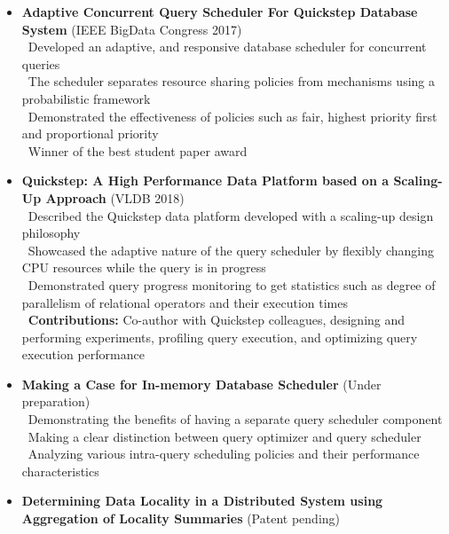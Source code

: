 \documentclass[11pt]{article}
\begin{document}
\begin{itemize}\addtolength{\itemsep}{-0.5\baselineskip}
\item{\textbf{Adaptive Concurrent Query Scheduler For Quickstep Database System} (IEEE BigData Congress 2017)}\\
		\textendash\ Developed an adaptive, and responsive database scheduler for concurrent queries\\
		\textendash\ The scheduler separates resource sharing policies from mechanisms using a probabilistic framework \\
		\textendash\ Demonstrated the effectiveness of policies such as fair, highest priority first and proportional priority\\
		\textendash\ Winner of the best student paper award\\
		
\item{\textbf{Quickstep: A High Performance Data Platform based
on a Scaling-Up Approach} (VLDB 2018)}	\\
		\textendash\ Described the Quickstep data platform developed with a scaling-up design philosophy\\
		\textendash\ Showcased the adaptive nature of the query scheduler by flexibly changing CPU resources while the query is in progress \\
		\textendash\ Demonstrated query progress monitoring to get statistics such as degree of parallelism of relational operators and their execution times\\
		\textendash\ \textbf{Contributions:} Co-author with Quickstep colleagues, designing and performing experiments, profiling query execution, and optimizing query execution performance\\
		
\item{\textbf{Making a Case for In-memory Database Scheduler} (Under preparation)}	\\
		\textendash\ Demonstrating the benefits of having a separate query scheduler component\\
		\textendash\ Making a clear distinction between query optimizer and query scheduler\\ 
		\textendash\ Analyzing various intra-query scheduling policies and their performance characteristics\\	

\item{\textbf{Determining Data Locality in a Distributed System using Aggregation of Locality Summaries}
	(Patent pending)}	
\end{itemize}
\end{document}

